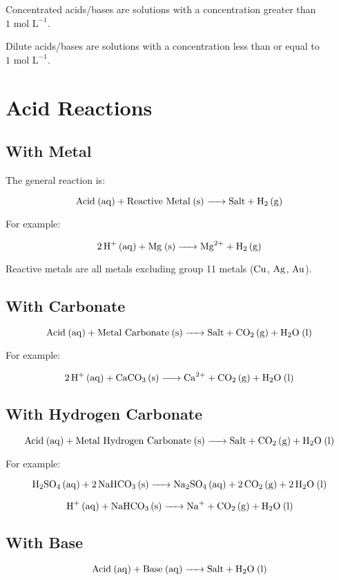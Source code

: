 \documentclass[a4paper,11pt]{article}
\begin{document}
Concentrated acids/bases are solutions with a concentration greater than
$1\mbox{ mol L}^{-1}$.

Dilute acids/bases are solutions with a concentration less than or equal to
$1\mbox{ mol L}^{-1}$.


\section{Acid Reactions}

\subsection{With Metal}

The general reaction is:

$$
\ce{\text{Acid} (aq) + \text{Reactive Metal} (s) -> \text{Salt} + H2 (g)}
$$

For example:

$$
\ce{2H+ (aq) + Mg (s) -> Mg^2+ + H2 (g)}
$$

Reactive metals are all metals excluding group 11 metals ($\ce{Cu}$, $\ce{Ag}$,
$\ce{Au}$).


\subsection{With Carbonate}

$$
\ce{\text{Acid} (aq) + \text{Metal Carbonate} (s) -> \text{Salt} + CO2 (g) + H2O (l)}
$$

For example:

$$
\ce{2H+ (aq) + CaCO3 (s) -> Ca^2+ + CO2 (g) + H2O (l)}
$$


\subsection{With Hydrogen Carbonate}

$$
\ce{\text{Acid} (aq) + \text{Metal Hydrogen Carbonate} (s) -> \text{Salt} + CO2 (g) + H2O (l)}
$$

For example:

$$
\ce{H2SO4 (aq) + 2NaHCO3 (s) -> Na2SO4 (aq) + 2CO2 (g) + 2H2O (l)}
$$

$$
\ce{H+ (aq) + NaHCO3 (s) -> Na+ + CO2 (g) + H2O (l)}
$$


\subsection{With Base}

$$
\ce{\text{Acid} (aq) + \text{Base} (aq) -> \text{Salt} + H2O (l)}
$$
\end{document}
